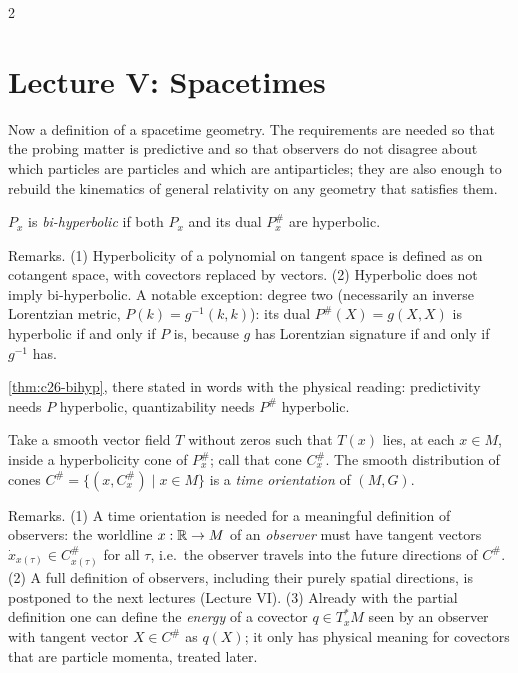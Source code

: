 \begin{paracol}{2}
\section{Lecture V: Spacetimes}\label{sec:c29-L5}

 Now a definition of a spacetime geometry. The requirements are needed so that the probing matter is predictive and so that observers do not disagree about which particles are particles and which are antiparticles; they are also enough to rebuild the kinematics of general relativity on any geometry that satisfies them.

\begin{definition}\label{def:c29-bihyp}
$P_x$ is \emph{bi-hyperbolic} if both $P_x$ and its dual $P^\#_x$ are hyperbolic.
\end{definition}

Remarks. (1) Hyperbolicity of a polynomial on tangent space is defined as on cotangent space, with covectors replaced by vectors. (2) Hyperbolic does not imply bi-hyperbolic. A notable exception: degree two (necessarily an inverse Lorentzian metric, $P(k)=g^{-1}(k,k)$): its dual $P^\#(X)=g(X,X)$ is hyperbolic if and only if $P$ is, because $g$ has Lorentzian signature if and only if $g^{-1}$ has.
\begin{recall}
\cref{thm:c26-bihyp}, there stated in words with the physical reading: predictivity needs $P$ hyperbolic, quantizability needs $P^\#$ hyperbolic.
\end{recall}

\begin{definition}\label{def:c29-timeor}
Take a smooth vector field $T$ without zeros such that $T(x)$ lies, at each $x\in M$, inside a hyperbolicity cone of $P^\#_x$; call that cone $C^\#_x$. The smooth distribution of cones $C^\#=\{(x,C^\#_x)\mid x\in M\}$ is a \emph{time orientation} of $(M,G)$.
\end{definition}

Remarks. (1) A time orientation is needed for a meaningful definition of observers: the worldline $x:\mathbb{R}\to M$ of an \emph{observer} must have tangent vectors $\dot x_{x(\tau)}\in C^\#_{x(\tau)}$ for all $\tau$, i.e.\ the observer travels into the future directions of $C^\#$. (2) A full definition of observers, including their purely spatial directions, is postponed to the next lectures (Lecture VI). (3) Already with the partial definition one can define the \emph{energy} of a covector $q\in T^*_xM$ seen by an observer with tangent vector $X\in C^\#$ as $q(X)$; it only has physical meaning for covectors that are particle momenta, treated later.


\end{paracol}
